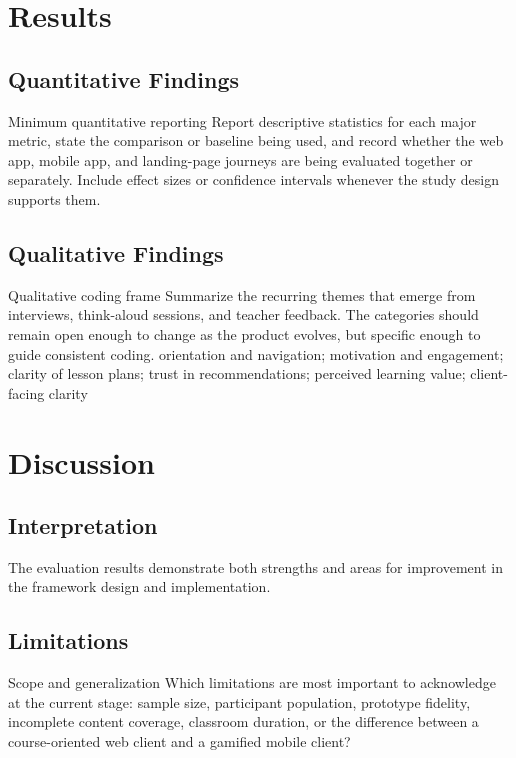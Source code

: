 \section{Results}

\subsection{Quantitative Findings}

\EvidencePrompt
  {Minimum quantitative reporting}
  {Report descriptive statistics for each major metric, state the comparison or baseline being used, and record whether the web app, mobile app, and landing-page journeys are being evaluated together or separately. Include effect sizes or confidence intervals whenever the study design supports them.}

\subsection{Qualitative Findings}

\CategoryPrompt
  {Qualitative coding frame}
  {Summarize the recurring themes that emerge from interviews, think-aloud sessions, and teacher feedback. The categories should remain open enough to change as the product evolves, but specific enough to guide consistent coding.}
  {orientation and navigation; motivation and engagement; clarity of lesson plans; trust in recommendations; perceived learning value; client-facing clarity}

\section{Discussion}

\subsection{Interpretation}

The evaluation results demonstrate both strengths and areas for improvement in the framework design and implementation.

\subsection{Limitations}

\OpenQuestionPrompt
  {Scope and generalization}
  {Which limitations are most important to acknowledge at the current stage: sample size, participant population, prototype fidelity, incomplete content coverage, classroom duration, or the difference between a course-oriented web client and a gamified mobile client?}
